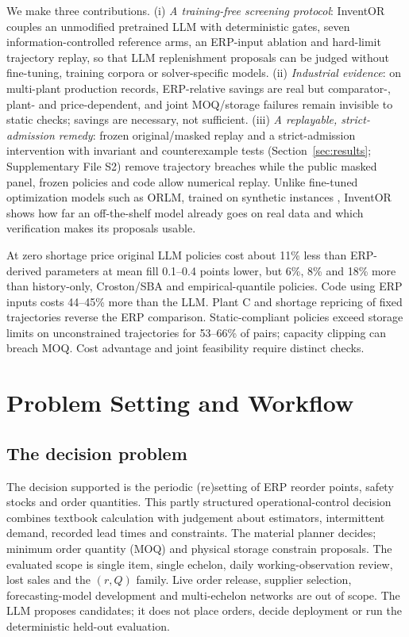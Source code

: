 \documentclass[preprint,12pt,nonatbib]{elsarticle}
\let\cite\parencite
\begin{document}
We make three contributions. (i) \emph{A training-free screening protocol}: InventOR couples an unmodified pretrained LLM with deterministic gates, seven information-controlled reference arms, an ERP-input ablation and hard-limit trajectory replay, so that LLM replenishment proposals can be judged without fine-tuning, training corpora or solver-specific models. (ii) \emph{Industrial evidence}: on multi-plant production records, ERP-relative savings are real but comparator-, plant- and price-dependent, and joint MOQ/storage failures remain invisible to static checks; savings are necessary, not sufficient. (iii) \emph{A replayable, strict-admission remedy}: frozen original/masked replay and a strict-admission intervention with invariant and counterexample tests (Section~\ref{sec:results}; Supplementary File S2) remove trajectory breaches while the public masked panel, frozen policies and code allow numerical replay. Unlike fine-tuned optimization models such as ORLM, trained on synthetic instances \cite{huang2025orlm}, InventOR shows how far an off-the-shelf model already goes on real data and which verification makes its proposals usable.

At zero shortage price original LLM policies cost about 11\% less than ERP-derived parameters at mean fill 0.1--0.4 points lower, but 6\%, 8\% and 18\% more than history-only, Croston/SBA and empirical-quantile policies. Code using ERP inputs costs 44--45\% more than the LLM. Plant C and shortage repricing of fixed trajectories reverse the ERP comparison. Static-compliant policies exceed storage limits on unconstrained trajectories for 53--66\% of pairs; capacity clipping can breach MOQ. Cost advantage and joint feasibility require distinct checks.


\section{Problem Setting and Workflow}
\label{sec:scope}

\subsection{The decision problem}
\label{subsec:decision}
The decision supported is the periodic (re)setting of ERP reorder points, safety stocks and order quantities. This partly structured operational-control decision \cite{gorry1971framework} combines textbook calculation with judgement about estimators, intermittent demand, recorded lead times and constraints. The material planner decides; minimum order quantity (MOQ) and physical storage constrain proposals. The evaluated scope is single item, single echelon, daily working-observation review, lost sales and the $(r,Q)$ family. Live order release, supplier selection, forecasting-model development and multi-echelon networks are out of scope. The LLM proposes candidates; it does not place orders, decide deployment or run the deterministic held-out evaluation.
\end{document}
